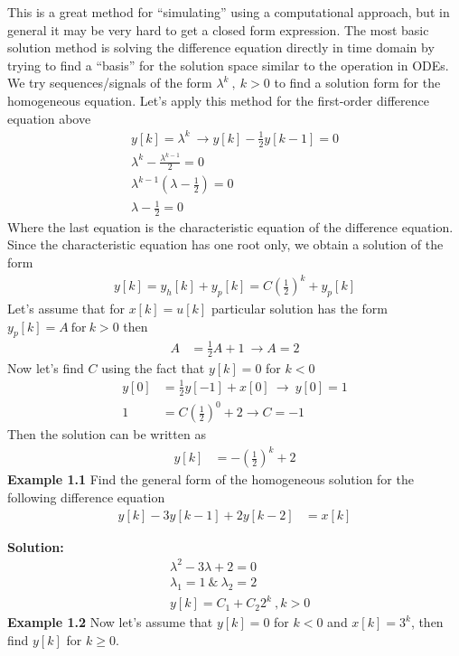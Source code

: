 \documentclass[twoside]{article}
\begin{document}
%
This is a great method for ``simulating'' using a computational
approach, but in general it may be very hard to get a closed 
form expression.
%
The most basic solution method is solving the difference equation
directly in time domain by trying to find a ``basis'' for the solution
space similar to the operation in ODEs. We try sequences/signals
of the form $\lambda^k \ , \ k >0$ to find a solution form for the
homogeneous equation. Let's apply this method for the first-order
difference equation above
%
\begin{align*}
y[k] = \lambda^k \ \rightarrow y[k] - \frac{1}{2} y[k-1] = 0 \\
\lambda^k - \frac{\lambda^{k-1}}{2} = 0 \\
\lambda^{k-1} \left( \lambda - \frac{1}{2}  \right) = 0 \\
\lambda - \frac{1}{2} = 0
\end{align*}
%
Where the last equation is the characteristic equation of the difference
equation. Since the characteristic equation has one root only, we
obtain a solution of the form
%
\begin{align*}
y[k] = y_h[k] + y_p[k] = C \left( \frac{1}{2} \right)^k + y_p[k]
\end{align*}
%
Let's assume that for $x[k] = u[k]$ particular solution has the 
form $y_p[k] = A \ \mathrm{for} \ k > 0$ then
%
\begin{align*}
A &= \frac{1}{2} A + 1 \ \rightarrow A = 2
\end{align*}
%
Now let's find $C$ using the fact that $y[k] = 0$ for $k<0$
%
\begin{align*}
y[0] &= \frac{1}{2} y[-1] + x[0] \ \rightarrow \  y[0] = 1
\\
1 &= C \left( \frac{1}{2} \right)^0 + 2 \rightarrow  C = -1
\end{align*}
%
Then the solution can be written as
%
\begin{align*}
  y[k] &= -\left( \frac{1}{2} \right)^k + 2
\end{align*}
%
\textbf{Example 1.1} Find the general form of the homogeneous solution
for the following difference equation
%
\begin{align*}
  y[k] - 3 y[k-1] + 2 y[k-2] &= x[k]
\end{align*}

\textbf{Solution:}
%
\begin{align*}
&\lambda^2 - 3 \lambda + 2 = 0
\\
&\lambda_1 = 1 \ \& \ \lambda_2 = 2 
\\
&y[k] = C_1 + C_2 2^k \ , k > 0 
\end{align*}
%
\textbf{Example 1.2} Now let's assume that $y[k] = 0$ for $k<0$
and $x[k] = 3^k$, then find $y[k]$ for $k \geq 0$.
\end{document}
